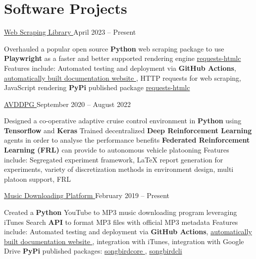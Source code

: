 \documentclass[a4paper,11pt]{article}
\newcommand{\github}{cboin1996} %
\begin{document}
\section{Software Projects}
\begin{subheading}
	\resumeProject
	{\href{https://github.com/cboin1996/requests-html}{Web Scraping Library \footnotesize{\faExternalLink}}} %
	{April 2023 -- Present} %
	\begin{entries}
        \ib Overhauled a popular open source \textbf{Python} web scraping package
        to use \textbf{Playwright} as a faster and better
        supported rendering engine
        \href{https://pypi.org/project/requests-htmlc/}{requests-htmlc \faExternalLink} 
        \ib Features include: Automated testing and deployment via \textbf{GitHub Actions}, \href{https://cboin1996.github.io/requests-html/latest/}{automatically built documentation website \faExternalLink},
        HTTP requests for web scraping, JavaScript rendering
        \ib \textbf{PyPi} published package \href{https://pypi.org/project/requests-htmlc/}{requests-htmlc \faExternalLink}
	\end{entries}
	\resumeProject
	{\href{https://github.com/\github/avddpg}{AVDDPG \footnotesize{\faExternalLink}}}
	{September 2020 -- August 2022} %
	\begin{entries}
		\ib Designed a co-operative adaptive cruise control environment in \textbf{Python} using \textbf{Tensorflow} and
		\textbf{Keras}
		\ib Trained decentralized \textbf{Deep Reinforcement Learning} agents in order to analyse the performance benefits \textbf{Federated Reinforcement Learning (FRL)}
		can provide to autonomous vehicle platooning
		\ib Features include: Segregated experiment framework, \LaTeX \hspace{0.5pt} report generation for experiments,
		variety of discretization methods in environment design, multi platoon support, FRL
	\end{entries}

	\resumeProject
	{\href{https://github.com/cboin1996/songbird}{Music Downloading Platform \footnotesize{\faExternalLink}}} %
	{February 2019 -- Present} %
	\begin{entries}
		\ib Created a \textbf{Python} YouTube to MP3 music downloading program leveraging iTunes Search \textbf{API} to format
        MP3 files with official MP3 metadata
        \ib Features include: Automated testing and deployment via \textbf{GitHub Actions}, \href{https://cboin1996.github.io/songbird/latest/}{automatically built documentation website \faExternalLink}, integration with iTunes,
        integration with Google Drive
        \ib \textbf{PyPi} published packages: \href{https://pypi.org/project/songbirdcore/}{songbirdcore \faExternalLink}, \href{https://pypi.org/project/songbirdcli/}{songbirdcli \faExternalLink}
	\end{entries}

\end{subheading}
\end{document}
